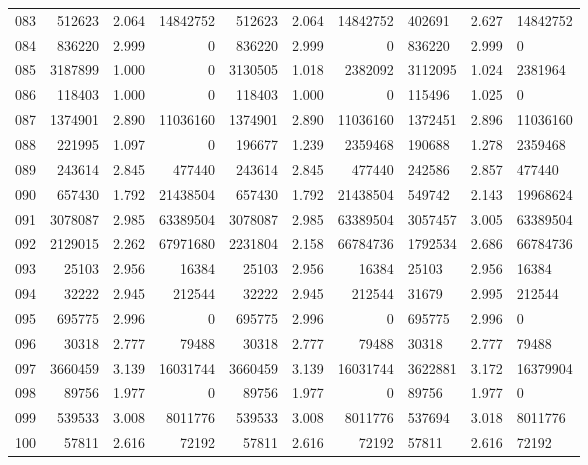 \begin{longtable}{crrrrrr}
083 & 512623 & 2.064 & 14842752 & 512623 & 2.064 & 14842752 & 402691 & 2.627 & 14842752 \\
084 & 836220 & 2.999 & 0 & 836220 & 2.999 & 0 & 836220 & 2.999 & 0 \\
085 & 3187899 & 1.000 & 0 & 3130505 & 1.018 & 2382092 & 3112095 & 1.024 & 2381964 \\
086 & 118403 & 1.000 & 0 & 118403 & 1.000 & 0 & 115496 & 1.025 & 0 \\
087 & 1374901 & 2.890 & 11036160 & 1374901 & 2.890 & 11036160 & 1372451 & 2.896 & 11036160 \\
088 & 221995 & 1.097 & 0 & 196677 & 1.239 & 2359468 & 190688 & 1.278 & 2359468 \\
089 & 243614 & 2.845 & 477440 & 243614 & 2.845 & 477440 & 242586 & 2.857 & 477440 \\
090 & 657430 & 1.792 & 21438504 & 657430 & 1.792 & 21438504 & 549742 & 2.143 & 19968624 \\
091 & 3078087 & 2.985 & 63389504 & 3078087 & 2.985 & 63389504 & 3057457 & 3.005 & 63389504 \\
092 & 2129015 & 2.262 & 67971680 & 2231804 & 2.158 & 66784736 & 1792534 & 2.686 & 66784736 \\
093 & 25103 & 2.956 & 16384 & 25103 & 2.956 & 16384 & 25103 & 2.956 & 16384 \\
094 & 32222 & 2.945 & 212544 & 32222 & 2.945 & 212544 & 31679 & 2.995 & 212544 \\
095 & 695775 & 2.996 & 0 & 695775 & 2.996 & 0 & 695775 & 2.996 & 0 \\
096 & 30318 & 2.777 & 79488 & 30318 & 2.777 & 79488 & 30318 & 2.777 & 79488 \\
097 & 3660459 & 3.139 & 16031744 & 3660459 & 3.139 & 16031744 & 3622881 & 3.172 & 16379904 \\
098 & 89756 & 1.977 & 0 & 89756 & 1.977 & 0 & 89756 & 1.977 & 0 \\
099 & 539533 & 3.008 & 8011776 & 539533 & 3.008 & 8011776 & 537694 & 3.018 & 8011776 \\
100 & 57811 & 2.616 & 72192 & 57811 & 2.616 & 72192 & 57811 & 2.616 & 72192 \\
\end{longtable}

